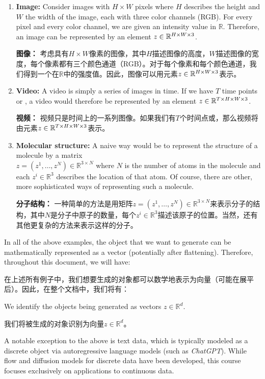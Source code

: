 \begin{enumerate}
    \item \textbf{\sffamily Image: }Consider images with $H \times W$ pixels where $H$ describes the height and $W$ the width of the image, each with three color channels (RGB). For every pixel and every color channel, we are given an intensity value in $\mathbb{R}$. Therefore, an image can be represented by an element $z\in\mathbb{R}^{H \times W \times 3}$.
    
    \textbf{\sffamily 图像：} 考虑具有$H \times W$像素的图像，其中$H$描述图像的高度，$W$描述图像的宽度，每个像素都有三个颜色通道（RGB）。对于每个像素和每个颜色通道，我们得到一个在$\mathbb{R}$中的强度值。因此，图像可以用元素$z\in\mathbb{R}^{H \times W \times 3}$表示。
    
    \item \textbf{\sffamily Video: }A video is simply a series of images in time. If we have $T$ time points or , a video would therefore be represented by an element $z\in\mathbb{R}^{T\times H \times W \times 3}$.
    
    \textbf{\sffamily 视频：} 视频只是时间上的一系列图像。如果我们有$T$个时间点或，那么视频将由元素$z\in\mathbb{R}^{T\times H \times W \times 3}$表示。
    
    \item \textbf{\sffamily Molecular structure: }A naive way would be to represent the structure of a molecule by a matrix \\$z=(z^1,\dots,z^N)\in\mathbb{R}^{3\times N}$ where $N$ is the number of atoms in the molecule and each $z^i\in\mathbb{R}^3$ describes the location of that atom. Of course, there are other, more sophisticated ways of representing such a molecule.
    
    \textbf{\sffamily 分子结构：} 一种简单的方法是用矩阵$z=(z^1,\dots,z^N)\in\mathbb{R}^{3\times N}$来表示分子的结构，其中$N$是分子中原子的数量，每个$z^i\in\mathbb{R}^3$描述该原子的位置。当然，还有其他更复杂的方法来表示这样的分子。
\end{enumerate}
In all of the above examples, the object that we want to generate can be mathematically represented as a vector (potentially after flattening). Therefore, throughout this document, we will have:

在上述所有例子中，我们想要生成的对象都可以数学地表示为向量（可能在展平后）。因此，在整个文档中，我们将有：

\begin{ideabox}
    We identify the objects being generated as vectors $z \in \mathbb{R}^d$.
    
    我们将被生成的对象识别为向量$z \in \mathbb{R}^d$。
\end{ideabox}
A notable exception to the above is text data, which is typically modeled as a discrete object via autoregressive language models (such as \emph{ChatGPT}). While flow and diffusion models for discrete data have been developed, this course focuses exclusively on applications to continuous data.

